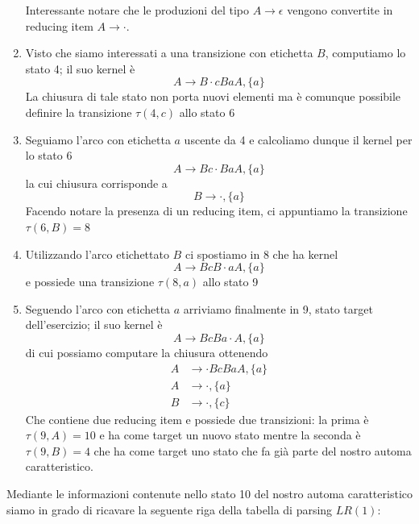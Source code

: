 \documentclass[class=book, crop=false, oneside, 12pt]{standalone}
\begin{document}
\begin{enumerate}
    Interessante notare che le produzioni del tipo \(A \to \epsilon\) vengono convertite in reducing item \(A \to \cdot\).
    \item Visto che siamo interessati a una transizione con etichetta \(B\), computiamo lo stato 4; il suo kernel è 
    \begin{equation*}
        A \to B \cdot cBaA, \{a\} 
    \end{equation*}
    La chiusura di tale stato non porta nuovi elementi ma è comunque possibile definire la transizione \(\tau(4,c)\) allo stato 6
    \item Seguiamo l'arco con etichetta \(a\) uscente da 4 e calcoliamo dunque il kernel per lo stato 6
    \begin{equation*}
        A \to Bc \cdot BaA, \{a\} 
    \end{equation*}
    la cui chiusura corrisponde a 
    \begin{equation*}
         B \to \cdot, \{a\} 
    \end{equation*}
    Facendo notare la presenza di un reducing item, ci appuntiamo la transizione \(\tau(6, B)=8\)
    \item Utilizzando l'arco etichettato \(B\) ci spostiamo in 8 che ha kernel
    \begin{equation*}
        A \to BcB \cdot aA, \{a\} 
    \end{equation*}
    e possiede una transizione \(\tau(8, a)\) allo stato 9
    \item Seguendo l'arco con etichetta \(a\) arriviamo finalmente in 9, stato target dell'esercizio; il suo kernel è
    \begin{equation*}
        A \to BcBa \cdot A, \{a\} 
    \end{equation*}
    di cui possiamo computare la chiusura ottenendo
    \begin{align*}
        A &\to \cdot BcBaA, \{a\} \\
        A &\to \cdot, \{a\} \\
        B &\to \cdot, \{c\}
    \end{align*}
    Che contiene due reducing item e possiede due transizioni: la prima è \(\tau(9, A)=10\) e ha come target un nuovo stato mentre la seconda è \(\tau(9, B)=4\) che ha come target uno stato che fa già parte del nostro automa caratteristico.
\end{enumerate}

Mediante le informazioni contenute nello stato 10 del nostro automa caratteristico siamo in grado di ricavare la seguente riga della tabella di parsing \(LR(1)\):
\end{document}

